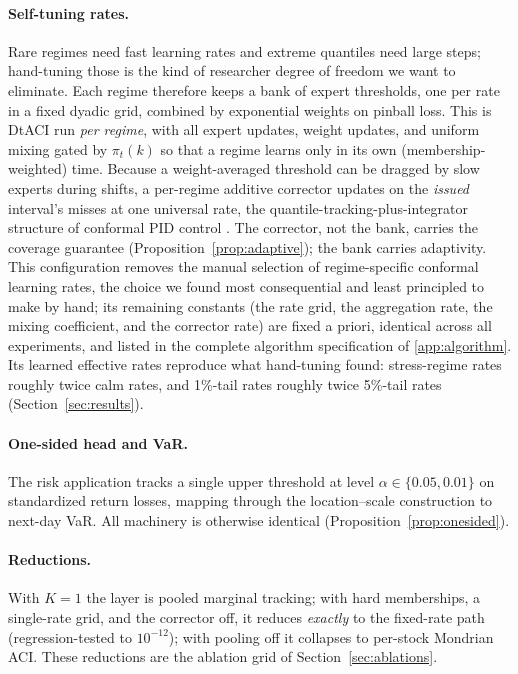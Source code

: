 \paragraph{Self-tuning rates.} Rare regimes need fast learning rates and
extreme quantiles need large steps; hand-tuning those is the kind of
researcher degree of freedom we want to eliminate. Each regime therefore
keeps a bank of expert thresholds, one per rate in a fixed dyadic grid,
combined by exponential weights on pinball loss. This is DtACI
\citep{gibbs2022conformal} run \emph{per regime}, with all expert updates,
weight updates, and uniform mixing gated by $\pi_t(k)$ so that a regime
learns only in its own (membership-weighted) time. Because a
weight-averaged threshold can be dragged by slow experts during shifts, a
per-regime additive corrector updates on the \emph{issued} interval's
misses at one universal rate, the quantile-tracking-plus-integrator
structure of conformal PID control \citep{angelopoulos2023conformal}. The
corrector, not the bank, carries the coverage guarantee
(Proposition~\ref{prop:adaptive}); the bank carries adaptivity. This
configuration removes the manual selection of regime-specific conformal
learning rates, the choice we found most consequential and least
principled to make by hand; its remaining constants (the rate grid, the
aggregation rate, the mixing coefficient, and the corrector rate) are
fixed a priori, identical across all experiments, and listed in the
complete algorithm specification of \ref{app:algorithm}. Its
learned effective rates reproduce what
hand-tuning found: stress-regime rates roughly twice calm rates, and
1\%-tail rates roughly twice 5\%-tail rates
(Section~\ref{sec:results}).

\paragraph{One-sided head and VaR.} The risk application tracks a single
upper threshold at level $\alpha \in \{0.05, 0.01\}$ on standardized
return losses, mapping through the location--scale construction to
next-day VaR. All machinery is otherwise identical
(Proposition~\ref{prop:onesided}).

\paragraph{Reductions.} With $K = 1$ the layer is pooled marginal
tracking; with hard memberships, a single-rate grid, and the corrector
off, it reduces \emph{exactly} to the fixed-rate path (regression-tested
to $10^{-12}$); with pooling off it collapses to per-stock Mondrian ACI.
These reductions are the ablation grid of
Section~\ref{sec:ablations}.
